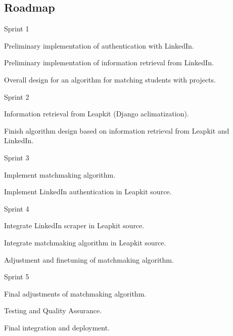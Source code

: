 \subsection{Roadmap}
\begin{itemize*}
  \item Sprint 1
        \begin{enumerate*}
          \item Preliminary implementation of authentication with LinkedIn.
          \item Preliminary implementation of information retrieval from LinkedIn.
          \item Overall design for an algorithm for matching students with projects.
        \end{enumerate*}
  \item Sprint 2
        \begin{enumerate*}
          \item Information retrieval from Leapkit (Django aclimatization).
          \item Finish algorithm design based on information retrieval from Leapkit and LinkedIn.
        \end{enumerate*}
  \item Sprint 3
        \begin{enumerate*}
          \item Implement matchmaking algorithm.
          \item Implement LinkedIn authentication in Leapkit source.
        \end{enumerate*}
  \item Sprint 4
        \begin{enumerate*}
          \item Integrate LinkedIn scraper in Leapkit source.
          \item Integrate matchmaking algorithm in Leapkit source.
          \item Adjustment and finetuning of matchmaking algorithm.
        \end{enumerate*}
  \item Sprint 5
        \begin{enumerate*}
          \item Final adjustments of matchmaking algorithm.
          \item Testing and Quality Assurance.
          \item Final integration and deployment.
        \end{enumerate*}
\end{itemize*}
